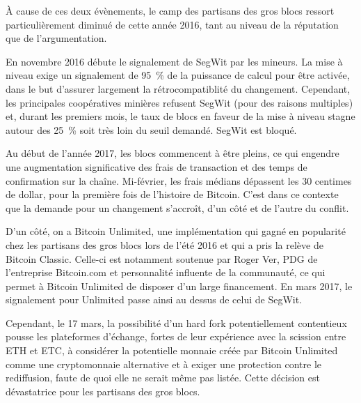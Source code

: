 À cause de ces deux évènements, le camp des partisans des gros blocs ressort particulièrement diminué de cette année 2016, tant au niveau de la réputation que de l'argumentation.

En novembre 2016 débute le signalement de SegWit par les mineurs. La mise à niveau exige un signalement de 95~\% de la puissance de calcul pour être activée, dans le but d'assurer largement la rétrocompatiblité du changement. Cependant, les principales coopératives minières refusent SegWit (pour des raisons multiples) et, durant les premiers mois, le taux de blocs en faveur de la mise à niveau stagne autour des 25~\% soit très loin du seuil demandé. SegWit est bloqué.

Au début de l'année 2017, les blocs commencent à être pleins, ce qui engendre une augmentation significative des frais de transaction et des temps de confirmation sur la chaîne. Mi-février, les frais médians dépassent les 30 centimes de dollar, pour la première fois de l'histoire de Bitcoin. C'est dans ce contexte que la demande pour un changement s'accroît, d'un côté et de l'autre du conflit.

D'un côté, on a Bitcoin Unlimited, une implémentation qui gagné en popularité chez les partisans des gros blocs lors de l'été 2016 et qui a pris la relève de Bitcoin Classic. Celle-ci est notamment soutenue par Roger Ver, PDG de l'entreprise Bitcoin.com et personnalité influente de la communauté, ce qui permet à Bitcoin Unlimited de disposer d'un large financement. En mars 2017, le signalement pour Unlimited passe ainsi au dessus de celui de SegWit. 

Cependant, le 17 mars, la possibilité d'un hard fork potentiellement contentieux pousse les plateformes d'échange, fortes de leur expérience avec la scission entre ETH et ETC, à considérer la potentielle monnaie créée par Bitcoin Unlimited comme une cryptomonnaie alternative et à exiger une protection contre le rediffusion, faute de quoi elle ne serait même pas listée. Cette décision est dévastatrice pour les partisans des gros blocs.

